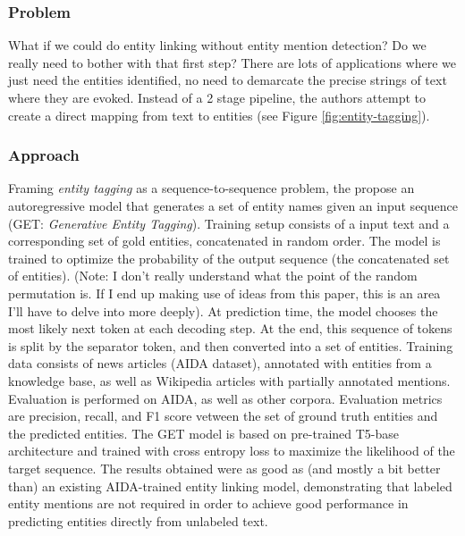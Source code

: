 \documentclass{article}
\begin{document}
\subsubsection{Problem}

What if we could do entity linking without entity mention detection? Do we really need to bother with that first step? There are lots of applications where we just need the entities identified, no need to demarcate the precise strings of text where they are evoked. Instead of a 2 stage pipeline, the authors attempt to create a direct mapping from text to entities (see Figure \ref{fig:entity-tagging}).

\subsubsection{Approach}

Framing \emph{entity tagging} as a sequence-to-sequence problem, the propose an autoregressive model that generates a set of entity names given an input sequence (GET: \emph{Generative Entity Tagging}). Training setup consists of a input text and a corresponding set of gold entities, concatenated in random order. The model is trained to optimize the probability of the output sequence (the concatenated set of entities). (Note: I don't really understand what the point of the random permutation is. If I end up making use of ideas from this paper, this is an area I'll have to delve into more deeply). At prediction time, the model chooses the most likely next token at each decoding step. At the end, this sequence of tokens is split by the separator token, and then converted into a set of entities. Training data consists of news articles (AIDA dataset), annotated with entities from a knowledge base, as well as Wikipedia articles with partially annotated mentions. Evaluation is performed on AIDA, as well as other corpora. Evaluation metrics are precision, recall, and F1 score vetween the set of ground truth entities and the predicted entities. The GET model is based on pre-trained T5-base architecture and trained with cross entropy loss to maximize the likelihood of the target sequence. The results obtained were as good as (and mostly a bit better than) an existing AIDA-trained entity linking model, demonstrating that labeled entity mentions are not required in order to achieve good performance in predicting entities directly from unlabeled text.

\end{document}
